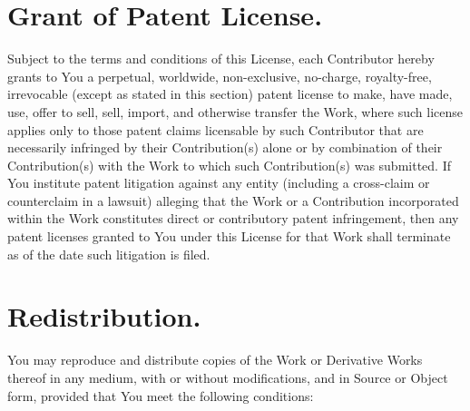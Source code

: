\documentclass[a4paper, 12pt]{article}
\begin{document}
\section{Grant of Patent License.}

Subject to the terms and conditions of this License, each Contributor hereby grants to You a perpetual, worldwide, non-exclusive, no-charge, royalty-free, irrevocable (except as stated in this section) patent license to make, have made, use, offer to sell, sell, import, and otherwise transfer the Work, where such license applies only to those patent claims licensable by such Contributor that are necessarily infringed by their Contribution(s) alone or by combination of their Contribution(s) with the Work to which such Contribution(s) was submitted. If You institute patent litigation against any entity (including a cross-claim or counterclaim in a lawsuit) alleging that the Work or a Contribution incorporated within the Work constitutes direct or contributory patent infringement, then any patent licenses granted to You under this License for that Work shall terminate as of the date such litigation is filed.

\section{Redistribution.}

You may reproduce and distribute copies of the Work or Derivative Works thereof in any medium, with or without modifications, and in Source or Object form, provided that You meet the following conditions:
\end{document}
